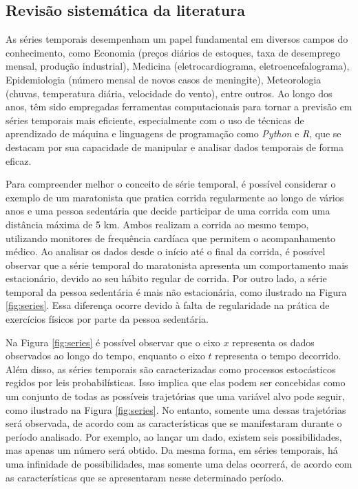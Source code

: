 \subsection{Revis\~ao sistem\'atica da literatura} \label{subsec:revisão}

As séries temporais desempenham um papel fundamental em diversos campos do conhecimento, como Economia (preços diários de estoques, taxa de desemprego mensal, produção industrial), Medicina (eletrocardiograma, eletroencefalograma), Epidemiologia (número mensal de novos casos de meningite), Meteorologia (chuvas, temperatura diária, velocidade do vento), entre outros. Ao longo dos anos, têm sido empregadas ferramentas computacionais para tornar a previsão em séries temporais mais eficiente, especialmente com o uso de técnicas de aprendizado de máquina e linguagens de programação como \textit{Python} e \textit{R}, que se destacam por sua capacidade de manipular e analisar dados temporais de forma eficaz.

Para compreender melhor o conceito de série temporal, é possível considerar o exemplo de um maratonista que pratica corrida regularmente ao longo de vários anos e uma pessoa sedentária que decide participar de uma corrida com uma distância máxima de 5 km. Ambos realizam a corrida ao mesmo tempo, utilizando monitores de frequência cardíaca que permitem o acompanhamento médico. Ao analisar os dados desde o início até o final da corrida, é possível observar que a série temporal do maratonista apresenta um comportamento mais estacionário, devido ao seu hábito regular de corrida. Por outro lado, a série temporal da pessoa sedentária é mais não estacionária, como ilustrado na Figura \ref{fig:series}. Essa diferença ocorre devido à falta de regularidade na prática de exercícios físicos por parte da pessoa sedentária.



Na Figura \ref{fig:series} é possível observar que o eixo $x$ representa os dados observados ao longo do tempo, enquanto o eixo $t$ representa o tempo decorrido. Além disso, as séries temporais são caracterizadas como processos estocásticos regidos por leis probabilísticas. Isso implica que elas podem ser concebidas como um conjunto de todas as possíveis trajetórias que uma variável alvo pode seguir, como ilustrado na Figura \ref{fig:series}. No entanto, somente uma dessas trajetórias será observada, de acordo com as características que se manifestaram durante o período analisado. Por exemplo, ao lançar um dado, existem seis possibilidades, mas apenas um número será obtido. Da mesma forma, em séries temporais, há uma infinidade de possibilidades, mas somente uma delas ocorrerá, de acordo com as características que se apresentaram nesse determinado período.

